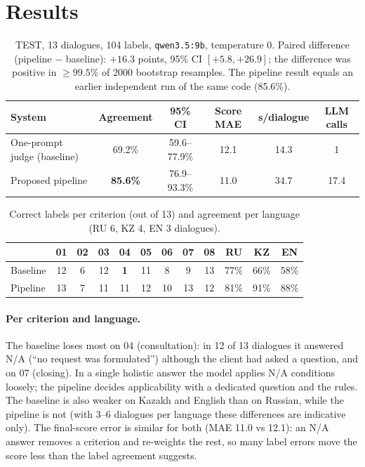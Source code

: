 \documentclass[11pt,a4paper]{article}
\begin{document}
\section{Results}\label{sec:results}
\begin{table}[h]\centering\small
\begin{tabular}{lccccc}
\toprule
System & Agreement & 95\% CI & Score MAE & s/dialogue & LLM calls\\
\midrule
One-prompt judge (baseline) & 69.2\% & 59.6--77.9\% & 12.1 & 14.3 & 1\\
Proposed pipeline & \textbf{85.6\%} & 76.9--93.3\% & 11.0 & 34.7 & 17.4\\
\bottomrule
\end{tabular}
\caption{TEST, 13 dialogues, 104 labels, \texttt{qwen3.5:9b}, temperature 0. Paired difference (pipeline
$-$ baseline): $+16.3$ points, 95\% CI $[+5.8, +26.9]$; the difference was positive in
$\geq 99.5\%$ of 2000 bootstrap resamples. The
pipeline result equals an earlier independent run of the same code (85.6\%).}
\label{tab:main}
\end{table}

\begin{table}[h]\centering\small
\begin{tabular}{lcccccccc|ccc}
\toprule
 & 01 & 02 & 03 & 04 & 05 & 06 & 07 & 08 & RU & KZ & EN\\
\midrule
Baseline & 12 & 6 & 12 & \textbf{1} & 11 & 8 & 9 & 13 & 77\% & 66\% & 58\%\\
Pipeline & 13 & 7 & 11 & 11 & 12 & 10 & 13 & 12 & 81\% & 91\% & 88\%\\
\bottomrule
\end{tabular}
\caption{Correct labels per criterion (out of 13) and agreement per language (RU 6, KZ 4, EN 3 dialogues).}
\label{tab:crit}
\end{table}

\paragraph{Per criterion and language.} The baseline loses most on 04 (consultation): in 12 of 13 dialogues
it answered N/A (``no request was formulated'') although the client had asked a question, and on 07
(closing). In a single holistic answer the model applies N/A conditions loosely; the pipeline decides
applicability with a dedicated question and the rules. The baseline is also weaker on Kazakh and English
than on Russian, while the pipeline is not (with 3--6 dialogues per language these differences are
indicative only). The final-score error is similar for both (MAE 11.0 vs 12.1): an N/A answer removes a
criterion and re-weights the rest, so many label errors move the score less than the label agreement
suggests.
\end{document}
